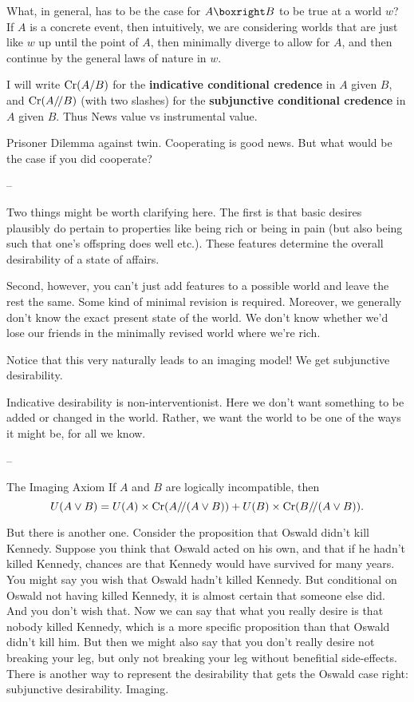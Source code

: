 {What, in general, has to be the case for $A \boxright B$ to be true at
a world $w$?  If $A$ is a concrete event, then intuitively, we are
considering worlds that are just like $w$ up until the point of $A$,
then minimally diverge to allow for $A$, and then continue by the
general laws of nature in $w$.




I will write $\text{Cr}(A/B)$ for the \textbf{indicative conditional
  credence} in $A$ given $B$, and $\text{Cr}(A/\!/B)$ (with two slashes) for
the \textbf{subjunctive conditional credence} in $A$ given $B$. Thus
News value vs instrumental value. 

Prisoner Dilemma against twin. Cooperating is good news. But what
would be the case if you did cooperate?

--

Two things might be worth clarifying here. The first is that basic
desires plausibly do pertain to properties like being rich or being in
pain (but also being such that one's offspring does well etc.). These
features determine the overall desirability of a state of affairs.

Second, however, you can't just add features to a possible world and
leave the rest the same. Some kind of minimal revision is
required. Moreover, we generally don't know the exact present state of
the world. We don't know whether we'd lose our friends in the
minimally revised world where we're rich.

Notice that this very naturally leads to an imaging model! We get
subjunctive desirability. 

Indicative desirability is non-interventionist. Here we don't want
something to be added or changed in the world. Rather, we want the
world to be one of the ways it might be, for all we know.

--

\begin{genericthm}{The Imaging Axiom}
  If $A$ and $B$ are logically incompatible, then 
  \[ U(A \lor B) =
  U(A)\times \text{Cr}(A/\!/(A\lor B)) + U(B)\times \text{Cr}(B/\!/(A \lor B)). \]
\end{genericthm}

But there is another one. Consider the proposition that Oswald didn't
kill Kennedy. Suppose you think that Oswald acted on his own, and that
if he hadn't killed Kennedy, chances are that Kennedy would have
survived for many years. You might say you wish that Oswald hadn't
killed Kennedy. But conditional on Oswald not having killed Kennedy,
it is almost certain that someone else did. And you don't wish
that. Now we can say that what you really desire is that nobody killed
Kennedy, which is a more specific proposition than that Oswald didn't
kill him. But then we might also say that you don't really desire not
breaking your leg, but only not breaking your leg without benefitial
side-effects. There is another way to represent the desirability that
gets the Oswald case right: subjunctive desirability. Imaging.


}
